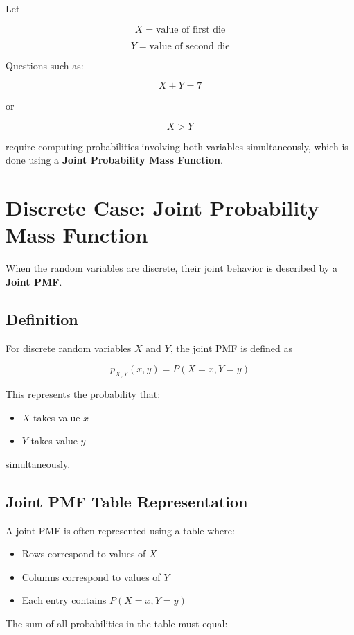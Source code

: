\documentclass[12pt]{article}
\begin{document}
Let

\[
X = \text{value of first die}
\]

\[
Y = \text{value of second die}
\]

Questions such as:

\[
X + Y = 7
\]

or

\[
X > Y
\]

require computing probabilities involving both variables simultaneously, which is done using a \textbf{Joint Probability Mass Function}.

\section{Discrete Case: Joint Probability Mass Function}

When the random variables are discrete, their joint behavior is described by a \textbf{Joint PMF}.

\subsection{Definition}

For discrete random variables \(X\) and \(Y\), the joint PMF is defined as

\[
p_{X,Y}(x,y) = P(X=x, Y=y)
\]

This represents the probability that:

\begin{itemize}
\item \(X\) takes value \(x\)
\item \(Y\) takes value \(y\)
\end{itemize}

simultaneously.

\subsection{Joint PMF Table Representation}

A joint PMF is often represented using a table where:

\begin{itemize}
\item Rows correspond to values of \(X\)
\item Columns correspond to values of \(Y\)
\item Each entry contains \(P(X=x, Y=y)\)
\end{itemize}

The sum of all probabilities in the table must equal:
\end{document}
